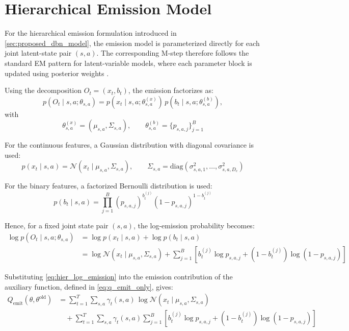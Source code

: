 \section{Hierarchical Emission Model}
\label{app:hierarchical_emission}

For the hierarchical emission formulation introduced in \autoref{sec:proposed_dbn_model}, 
the emission model is parameterized directly for each joint latent-state pair \((s,a)\). 
The corresponding M-step therefore follows the standard \ac{EM} pattern for latent-variable 
models, where each parameter block is updated using posterior weights \cite{Dempster1977,Bilmes1998}.

Using the decomposition $O_t=(x_t,b_t)$, the emission factorizes as:
\begin{equation}
p(O_t \mid s,a;\theta_{s,a})
=
p(x_t \mid s,a;\theta^{(x)}_{s,a})\,
p(b_t \mid s,a;\theta^{(b)}_{s,a}),
\end{equation}
with
\begin{equation}
\theta^{(x)}_{s,a} = (\mu_{s,a}, \Sigma_{s,a}),
\qquad
\theta^{(b)}_{s,a} = \{p_{s,a,j}\}_{j=1}^{B}
\end{equation}


For the continuous features, a Gaussian distribution with diagonal covariance is used:
\begin{equation}
p(x_t \mid s,a)
=
\mathcal{N}(x_t \mid \mu_{s,a},\Sigma_{s,a}),
\qquad
\Sigma_{s,a}
=
\mathrm{diag}\!\left(\sigma^2_{s,a,1},\dots,\sigma^2_{s,a,D_c}\right)
\end{equation}

For the binary features, a factorized Bernoulli distribution is used:
\begin{equation}
p(b_t \mid s,a)
=
\prod_{j=1}^{B}
(p_{s,a,j})^{b_t^{(j)}}(1-p_{s,a,j})^{1-b_t^{(j)}}
\end{equation}


Hence, for a fixed joint state pair \((s,a)\), the log-emission probability becomes:
\begin{align}
\log p(O_t \mid s,a;\theta_{s,a})
&=
\log p(x_t \mid s,a)
+
\log p(b_t \mid s,a)
\nonumber\\
&=
\log \mathcal{N}(x_t \mid \mu_{s,a},\Sigma_{s,a})
+
\sum_{j=1}^{B}
\left[
b_t^{(j)}\log p_{s,a,j}
+
(1-b_t^{(j)})\log(1-p_{s,a,j})
\right]
\label{eq:hier_log_emission}
\end{align}

Substituting \eqref{eq:hier_log_emission} into the emission contribution of the auxiliary function,
defined in \eqref{eq:q_emit_only}, gives:
\begin{align}
Q_{\mathrm{emit}}(\theta,\theta^{\mathrm{old}})
&=
\sum_{t=1}^{T}\sum_{s,a}
\gamma_t(s,a)\,
\log \mathcal{N}(x_t \mid \mu_{s,a},\Sigma_{s,a})
\nonumber\\
&\quad+
\sum_{t=1}^{T}\sum_{s,a}
\gamma_t(s,a)
\sum_{j=1}^{B}
\left[
b_t^{(j)}\log p_{s,a,j}
+
(1-b_t^{(j)})\log(1-p_{s,a,j})
\right]
\label{eq:hier_qemit_expanded}
\end{align}


